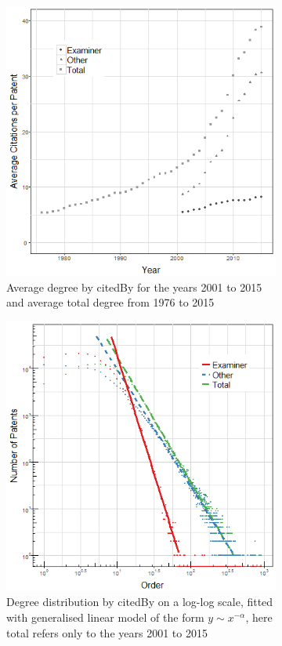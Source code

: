 \begin{figure}
\centering
\begin{subfigure}{\textwidth}
  \centering
  \includegraphics[width=0.7\linewidth]{Figures/av_degree_vs_year}
 \caption[]{\small Average degree by citedBy for the years 2001 to 2015 and average total degree from 1976 to 2015}
\label{fig:av_degree_vs_year}
\end{subfigure}%

\begin{subfigure}{\textwidth}
  \centering
  \includegraphics[width=0.7\linewidth]{Figures/orderDistributionCitedBy}
  \caption[]{\small Degree distribution by citedBy on a log-log scale, fitted with generalised linear model of the form $y \sim x^{-\alpha}$, here total refers only to the years 2001 to 2015}
\label{fig:orderDistributionCitedBy}
\end{subfigure}
\caption[]{}
\label{fig:degreeCitedBy}
\end{figure}

